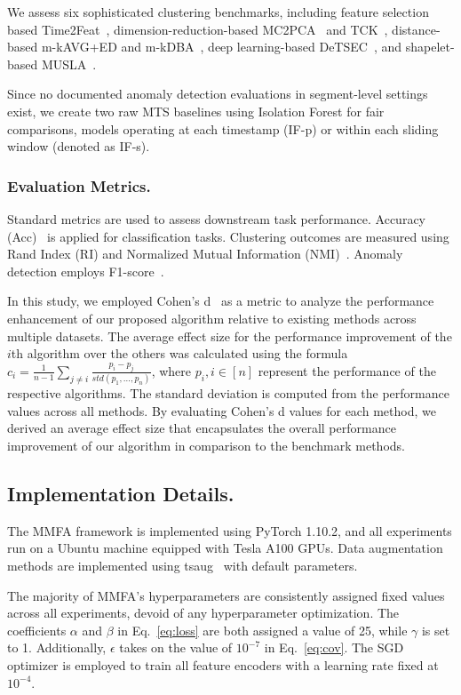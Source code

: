 We assess six sophisticated clustering benchmarks, including feature selection based Time2Feat~\cite{bonifati2022time2feat}, dimension-reduction-based MC2PCA~\cite{li2019multivariate} and TCK~\cite{mikalsen2018time}, distance-based m-kAVG+ED and m-kDBA~\cite{ozer2020discovering}, deep learning-based DeTSEC~\cite{ienco2020deep}, and shapelet-based MUSLA~\cite{zhang2022multiview}.

Since no documented anomaly detection evaluations in segment-level settings exist, we create two raw MTS baselines using Isolation Forest for fair comparisons, models operating at each timestamp (IF-p) or within each sliding window (denoted as IF-s).

\subsubsection{Evaluation Metrics.} Standard metrics are used to assess downstream task performance. Accuracy (Acc)~\cite{bagnall2018uea} is applied for classification tasks. Clustering outcomes are measured using Rand Index (RI) and Normalized Mutual Information (NMI)~\cite{zhang2022multiview, zhang2018salient}. Anomaly detection employs F1-score~\cite{li2021multivariate}.

In this study, we employed Cohen's d~\cite{becker2000effect} as a metric to analyze the performance enhancement of our proposed algorithm relative to existing methods across multiple datasets. The average effect size for the performance improvement of the $i$th algorithm over the others was calculated using the formula \( c_i = \frac 1 {n-1} \sum_{j\neq i}\frac{p_i - p_j}{ std(p_1, \ldots, p_n)} \), where \( p_i, i \in [n] \) represent the performance of the respective algorithms. The standard deviation is computed from the performance values across all methods. By evaluating Cohen's d values for each method, we derived an average effect size that encapsulates the overall performance improvement of our algorithm in comparison to the benchmark methods.

\subsection{Implementation Details.} The MMFA framework is implemented using PyTorch 1.10.2, and all experiments run on a Ubuntu machine equipped with Tesla A100 GPUs. Data augmentation methods are implemented using tsaug~\cite{tsaug} with default parameters.

The majority of MMFA's hyperparameters are consistently assigned fixed values across all experiments, devoid of any hyperparameter optimization. The coefficients $\alpha$ and $\beta$ in Eq.~\ref{eq:loss} are both assigned a value of 25, while $\gamma$ is set to 1. Additionally, $\epsilon$ takes on the value of $10^{-7}$ in Eq.~\ref{eq:cov}. The SGD optimizer is employed to train all feature encoders with a learning rate fixed at $10^{-4}$.

